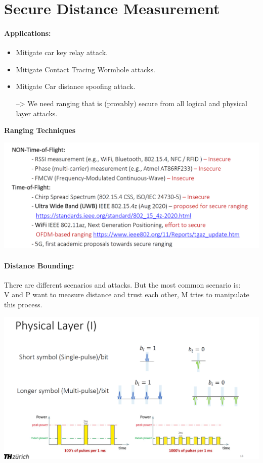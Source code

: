 \section{Secure Distance Measurement}

\paragraph{Applications:}
\begin{itemize}
    \item Mitigate car key relay attack.
    \item Mitigate Contact Tracing Wormhole attacks.
    \item Mitigate Car distance spoofing attack.
    \item[-->] We need ranging that is (provably) secure from all logical and physical layer attacks.
\end{itemize}
\vspace{0.2cm}
\textbf{Ranging Techniques}\\
\begin{minipage}{\linewidth}
    \centering      
    \includegraphics[width=\linewidth]{Figures/L5_ranging_techniques.PNG} 
\end{minipage}

\paragraph{Distance Bounding:} There are different scenarios and attacks. But the most common scenario is:\\
V and P want to measure distance and trust each other, M tries to manipulate this process.

\begin{minipage}{\linewidth}
    \centering      
    \includegraphics[width=\linewidth]{Figures/L5_physical_layer.PNG} 
\end{minipage}

